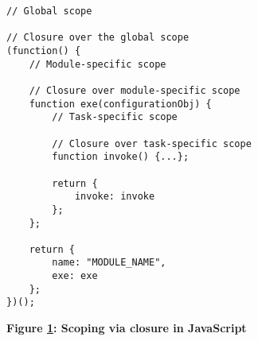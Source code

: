 \begin{figure}[H]
  \centering
  \begin{mdframed}[rightline=true,leftline=true]
    \begin{verbatim}
// Global scope

// Closure over the global scope
(function() {
    // Module-specific scope

    // Closure over module-specific scope
    function exe(configurationObj) {
        // Task-specific scope

        // Closure over task-specific scope
        function invoke() {...};

        return {
            invoke: invoke
        };
    };

    return {
        name: "MODULE_NAME",
        exe: exe
    };
})();
    \end{verbatim}
  \end{mdframed}
  \caption[Module Scope via closure]{\textbf{Figure \ref{fig-scope}: Scoping via closure in JavaScript}}
  \label{fig-scope}
\end{figure}